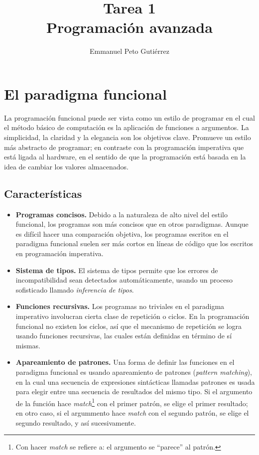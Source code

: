 \documentclass{article}
\title{Tarea 1\\Programación avanzada}
\author{Emmanuel Peto Gutiérrez}
\begin{document}
\maketitle

\section{El paradigma funcional}

La programación funcional puede ser vista como un estilo de programar en el cual el método básico de computación es la aplicación de funciones a argumentos. La simplicidad, la claridad y la elegancia son los objetivos clave. Promueve un estilo más abstracto de programar; en contraste con la programación imperativa que está ligada al hardware, en el sentido de que la programación está basada en la idea de cambiar los valores almacenados.

\subsection{Características}

\begin{itemize}

\item \textbf{Programas concisos.} Debido a la naturaleza de alto nivel del estilo funcional, los programas son más concisos que en otros paradigmas. Aunque es difícil hacer una comparación objetiva, los programas escritos en el paradigma funcional suelen ser más cortos en líneas de código que los escritos en programación imperativa.

\item \textbf{Sistema de tipos.} El sistema de tipos permite que los errores de incompatibilidad sean detectados automáticamente, usando un proceso sofisticado llamado \textit{inferencia de tipos}.

\item \textbf{Funciones recursivas.} Los programas no triviales en el paradigma imperativo involucran cierta clase de repetición o ciclos. En la programación funcional no existen los ciclos, así que el mecanismo de repetición se logra usando funciones recursivas, las cuales están definidas en término de sí mismas.

\item \textbf{Apareamiento de patrones.} Una forma de definir las funciones en el paradigma funcional es usando apareamiento de patrones (\textit{pattern matching}), en la cual una secuencia de expresiones sintácticas llamadas patrones es usada para elegir entre una secuencia de resultados del mismo tipo. Si el argumento de la función hace \textit{match}\footnote{Con hacer \textit{match} se refiere a: el argumento se ``parece'' al patrón.} con el primer patrón, se elige el primer resultado; en otro caso, si el argummento hace \textit{match} con el segundo patrón, se elige el segundo resultado, y así sucesivamente.

\end{itemize}
\end{document}
